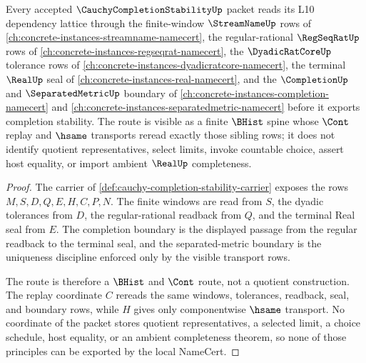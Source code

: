 \begin{theorem}
\label{thm:cauchycompletionstability-l10-sibling-route}
Every accepted $\CauchyCompletionStabilityUp$ packet reads its L10 dependency lattice through the finite-window $\StreamNameUp$ rows of \autoref{ch:concrete-instances-streamname-namecert}, the regular-rational $\RegSeqRatUp$ rows of \autoref{ch:concrete-instances-regseqrat-namecert}, the $\DyadicRatCoreUp$ tolerance rows of \autoref{ch:concrete-instances-dyadicratcore-namecert}, the terminal $\RealUp$ seal of \autoref{ch:concrete-instances-real-namecert}, and the $\CompletionUp$ and $\SeparatedMetricUp$ boundary of \autoref{ch:concrete-instances-completion-namecert} and \autoref{ch:concrete-instances-separatedmetric-namecert} before it exports completion stability. The route is visible as a finite $\BHist$ spine whose $\Cont$ replay and $\hsame$ transports reread exactly those sibling rows; it does not identify quotient representatives, select limits, invoke countable choice, assert host equality, or import ambient $\RealUp$ completeness.
\end{theorem}
\begin{proof}
The carrier of \autoref{def:cauchy-completion-stability-carrier} exposes the rows $M,S,D,Q,E,H,C,P,N$. The finite windows are read from $S$, the dyadic tolerances from $D$, the regular-rational readback from $Q$, and the terminal Real seal from $E$. The completion boundary is the displayed passage from the regular readback to the terminal seal, and the separated-metric boundary is the uniqueness discipline enforced only by the visible transport rows.

The route is therefore a $\BHist$ and $\Cont$ route, not a quotient construction. The replay coordinate $C$ rereads the same windows, tolerances, readback, seal, and boundary rows, while $H$ gives only componentwise $\hsame$ transport. No coordinate of the packet stores quotient representatives, a selected limit, a choice schedule, host equality, or an ambient completeness theorem, so none of those principles can be exported by the local NameCert.
\end{proof}
